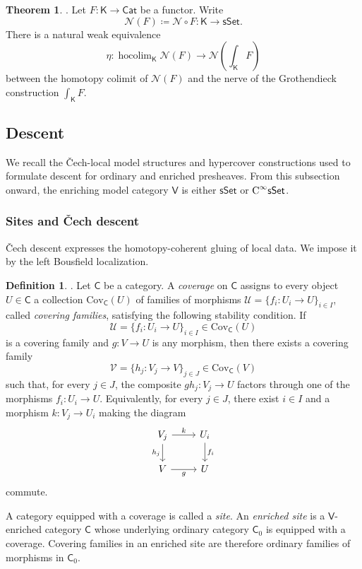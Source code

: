 \documentclass{amsart}
\newcommand{\cat}[1]{\mathsf{#1}}
\newcommand{\sset}{\cat{sSet}}
\newcommand{\nerve}{\mathcal{N}}
\DeclareMathOperator*{\hocolim}{hocolim}
\newcommand{\CsSet}{\textnormal{C}^{\infty}\sset}
\theoremstyle{definition}
\newtheorem{theorem}[equation]{Theorem}
\newtheorem{definition}[equation]{Definition}
\numberwithin{equation}{subsection}
\numberwithin{subsubsection}{subsection}
\begin{document}
\begin{theorem}\label{thm:thomason}
  \textnormal{\cite[Theorem~1.2]{Tho79}}.
  Let \(F:\cat{K}\to \cat{Cat}\) be a functor. Write
  \[
    \nerve(F)\coloneqq\nerve\circ F:\cat{K}\longrightarrow\sset.
  \]
  There is a natural weak
  equivalence
  \[
    \eta:\hocolim_{\cat{K}}\nerve(F)\to \nerve\left(\int_{\cat{K}}F\right)
  \]
  between the homotopy colimit of \(\nerve(F)\) and the nerve of the
  Grothendieck construction \(\int_{\cat{K}}F\).
\end{theorem}

\subsection{Descent}\label{subsec:descent}
We recall the \v{C}ech-local model structures and hypercover constructions used
to formulate descent for ordinary and enriched presheaves. From this subsection
onward, the enriching model category \(\cat{V}\) is either \(\sset\) or
\(\CsSet\).

\subsubsection{Sites and \v{C}ech descent}
\v{C}ech descent expresses the homotopy-coherent gluing of local data. We impose
it by the left Bousfield localization.

\begin{definition}\label{def:coverage.sieve}\label{def:coverage.site}
  \textnormal{\cite[Definition~C2.1.1]{Joh02}}.
  Let \(\cat{C}\) be a category. A \emph{coverage} on \(\cat{C}\)
  assigns to every object \(U\in\cat{C}\) a collection
  \(\mathrm{Cov}_{\cat{C}}(U)\) of families of morphisms \(
  \mathcal{U}=\{f_i:U_i\to U\}_{i\in I}\), called \emph{covering families},
  satisfying the following stability
  condition. If
  \[
    \mathcal{U}
    =
    \{f_i:U_i\to U\}_{i\in I}
    \in
    \mathrm{Cov}_{\cat{C}}(U)
  \]
  is a covering family and \(g:V\to U\) is any morphism, then there exists
  a covering family
  \[
    \mathcal{V}
    =
    \{h_j:V_j\to V\}_{j\in J}
    \in
    \mathrm{Cov}_{\cat{C}}(V)
  \]
  such that, for every \(j\in J\), the composite
  \(g h_j:V_j\to U\) factors through one of the morphisms
  \(f_i:U_i\to U\). Equivalently, for every \(j\in J\), there exist
  \(i\in I\) and a morphism \(k:V_j\to U_i\) making the diagram
  \[
    \begin{tikzcd}
      {V_j} & {U_i} \\
      V & U
      \arrow["k", from=1-1, to=1-2]
      \arrow["{h_j}"', from=1-1, to=2-1]
      \arrow["{f_i}", from=1-2, to=2-2]
      \arrow["g"', from=2-1, to=2-2]
    \end{tikzcd}
  \]
  commute.

  A category equipped with a coverage is called a \emph{site}. An \emph{enriched
  site} is a \(\cat{V}\)-enriched category
  \(\cat{C}\) whose underlying ordinary category \(\cat{C}_{0}\) is
  equipped with a coverage. Covering families in an enriched site are
  therefore ordinary families of morphisms in \(\cat{C}_{0}\).
\end{definition}
\end{document}
